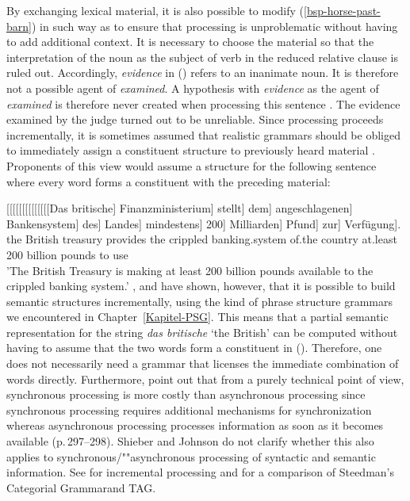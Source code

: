 \noindent
By exchanging lexical material, it is also possible to modify (\ref{bsp-horse-past-barn}) in such way as to
ensure that processing is unproblematic without having to add additional context. It is necessary
to choose the material so that the interpretation of the noun as the subject of verb in the reduced
relative clause is ruled out. Accordingly, \emph{evidence} in () refers to an inanimate noun.
It is therefore not a possible agent of \emph{examined}. A hypothesis with \emph{evidence} as the
agent of \emph{examined} is therefore never created when processing this sentence
\citep{SW2011a}.
\ea
The evidence examined by the judge turned out to be unreliable.
\z
Since processing proceeds incrementally, it is sometimes assumed that realistic grammars should be obliged to immediately assign a constituent structure to previously heard
material \citep{AS82a,Hausser92a-u}.
Proponents of this view would assume a structure for the following sentence where every word forms a constituent with the
preceding material:

\ea
\gll {}[[[[[[[[[[[[[[Das britische] Finanzministerium] stellt] dem] angeschlagenen] Bankensystem] des] Landes] mindestens] 200] Milliarden] Pfund] zur] Verfügung].\\
{}\spacebr{}\spacebr{}\spacebr{}\spacebr{}\spacebr{}\spacebr{}\spacebr{}\spacebr{}\spacebr{}\spacebr{}\spacebr{}\spacebr{}\spacebr{}\spacebr{}the British treasury provides the
crippled banking.system of.the country at.least 200 billion pounds to use\\
\glt 'The British Treasury is making at least 200 billion pounds available to the crippled banking system.'
\z
\citet{Pulman85a}, \citet{Stabler91a} and \citet[--308]{SJ93a} have shown, however, that it is possible to build semantic structures incrementally,
using the kind of phrase structure grammars we encountered in Chapter~\ref{Kapitel-PSG}. This means that a partial semantic representation for the
string \emph{das britische} `the British' can be computed without having to assume that the two words form a constituent in ().
Therefore, one does not necessarily need a grammar that licenses the immediate combination of words directly.
Furthermore,  point out that from a purely technical point of view, synchronous processing is more costly than asynchronous processing since
synchronous processing requires additional mechanisms for synchronization whereas asynchronous processing processes information as soon as it
becomes available (p.\,297--298). Shieber and Johnson do not clarify whether this also applies to synchronous/""asynchronous processing of syntactic and semantic
information. See  for incremental processing and for a comparison of Steedman's Categorial Grammar\indexcg and TAG\indextag.

